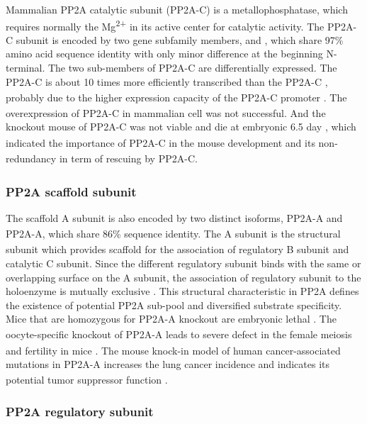 Mammalian \gls{PP2A} catalytic subunit (PP2A-C) is a metallophosphatase, which requires normally the Mg\textsuperscript{2+} in its active center for catalytic activity. The PP2A-C subunit is encoded by two gene subfamily members, \textalpha{} and \textbeta{}, which share 97\% amino acid sequence identity with only minor difference at the beginning N-terminal. The two sub-members of PP2A-C are differentially expressed. The PP2A-C\textsubscript{\textalpha} is about 10 times more efficiently transcribed than the PP2A-C\textsubscript{\textbeta} \cite{khew-goodall_tissue-specific_1988}, probably due to the higher expression capacity of the PP2A-C\textsubscript{\textalpha} promoter \cite{khew-goodall_structure_1991}. The overexpression of PP2A-C in mammalian cell was not successful. And the knockout mouse of PP2A-C\textsubscript{\textalpha} was not viable and die at embryonic 6.5 day \cite{gotz_delayed_1998}, which indicated the importance of PP2A-C\textsubscript{\textalpha} in the mouse development and its non-redundancy in term of rescuing by PP2A-C\textsubscript{\textbeta}.

\subsubsection{PP2A scaffold subunit}

The scaffold A subunit is also encoded by two distinct isoforms, PP2A-A\textsubscript{\textalpha} and PP2A-A\textsubscript{\textbeta}, which share 86\% sequence identity. The A subunit is the structural subunit which provides scaffold for the association of regulatory B subunit and catalytic C subunit. Since the different regulatory subunit binds with the same or overlapping surface on the A subunit, the association of regulatory subunit to the holoenzyme is mutually exclusive \cite{cho_crystal_2007,ruediger_molecular_1994}. This structural characteristic in PP2A defines the existence of potential PP2A sub-pool and diversified substrate specificity. 
Mice that are homozygous for PP2A-A\textsubscript{\textalpha} knockout are embryonic lethal \cite{ruediger_human_2011}. The oocyte-specific knockout of PP2A-A\textsubscript{\textalpha} leads to severe defect in the female meiosis and fertility in mice \cite{hu_scaffold_2014}. The mouse knock-in model of human cancer-associated mutations in PP2A-A\textsubscript{\textalpha} increases the lung cancer incidence and indicates its potential tumor suppressor function \cite{ruediger_human_2011}. 

\subsubsection{PP2A regulatory subunit}


